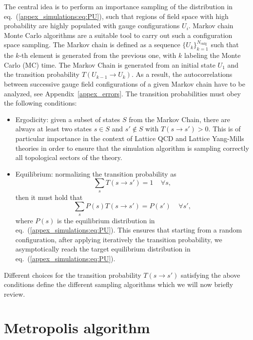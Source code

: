 The central idea is to perform an importance sampling of the distribution in eq.~(\ref{appex_simulations:eq:PU}), such that regions of field space with high probability are highly populated with gauge configurations $U_i$. Markov chain Monte Carlo algorithms are a suitable tool to carry out such a configuration space sampling. The Markov chain is defined as a sequence $\{U_k\}_{k=1}^{N_{\textrm{cnfg}}}$ such that the $k$-th element is generated from the previous one, with $k$ labeling the Monte Carlo (MC) time. The Markov Chain is generated from an initial state $U_1$ and the transition probability $T(U_{k-1}\rightarrow U_k)$. As a result, the autocorrelations between successive gauge field configurations of a given Markov chain have to be analyzed, see Appendix~\ref{appex_errors}. The transition probabilities must obey the following conditions:
\begin{itemize}
\item Ergodicity: given a subset of states $S$ from the Markov Chain, there are always at least two states $s\in S$ and $s'\notin S$ with $T(s\rightarrow s')>0$. This is of particular importance in the context of Lattice QCD and Lattice Yang-Mills theories in order to ensure that the simulation algorithm is sampling correctly all topological sectors of the theory.
\item Equilibrium: normalizing the transition probability as
\begin{equation}
\sum_sT(s\rightarrow s')=1\;\;\;\;\forall s,
\end{equation}
then it must hold that
\begin{equation}
\sum_sP(s)T(s\rightarrow s')=P(s')\;\;\;\;\forall s',
\end{equation}
where $P(s)$ is the equilibrium distribution in eq.~(\ref{appex_simulations:eq:PU}). This ensures that starting from a random configuration, after applying iteratively the transition probability, we asymptotically reach the target equilibrium distribution in eq.~(\ref{appex_simulations:eq:PU}). 
\end{itemize}

Different choices for the transition probability $T(s\rightarrow s')$ satisfying the above conditions define the different sampling algorithms which we will now briefly review.

\section{Metropolis algorithm}


